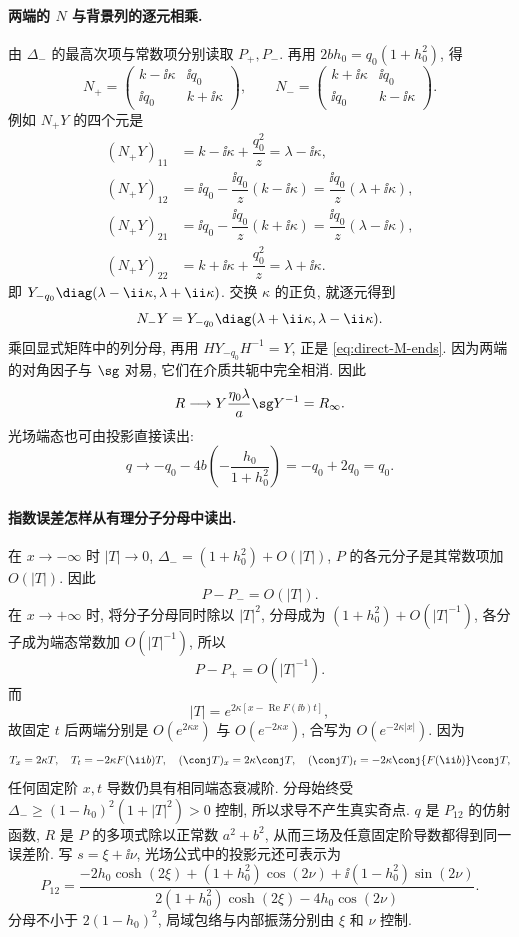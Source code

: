 \paragraph{两端的 $N$ 与背景列的逐元相乘.}
由 $\Delta_-$ 的最高次项与常数项分别读取 $P_+,P_-$.
再用 $2bh_0=q_0(1+h_0^2)$, 得
\[
N_+=\begin{pmatrix}k-\ii\kappa&\ii q_0\\
\ii q_0&k+\ii\kappa\end{pmatrix},\qquad
N_-=\begin{pmatrix}k+\ii\kappa&\ii q_0\\
\ii q_0&k-\ii\kappa\end{pmatrix}.
\]
例如 $N_+Y$ 的四个元是
\[
\begin{aligned}
(N_+Y)_{11}&=k-\ii\kappa+\dfrac{q_0^2}{z}=\lambda-\ii\kappa,\\
(N_+Y)_{12}&=\ii q_0-\dfrac{\ii q_0}{z}(k-\ii\kappa)
=\dfrac{\ii q_0}{z}(\lambda+\ii\kappa),\\
(N_+Y)_{21}&=\ii q_0-\dfrac{\ii q_0}{z}(k+\ii\kappa)
=\dfrac{\ii q_0}{z}(\lambda-\ii\kappa),\\
(N_+Y)_{22}&=k+\ii\kappa+\dfrac{q_0^2}{z}=\lambda+\ii\kappa.
\end{aligned}
\]
即 $Y_{-q_0}\diag(\lambda-\ii\kappa,\lambda+\ii\kappa)$.
交换 $\kappa$ 的正负, 就逐元得到
\[
N_-Y=Y_{-q_0}\diag(\lambda+\ii\kappa,\lambda-\ii\kappa).
\]
乘回显式矩阵中的列分母, 再用 $HY_{-q_0}H^{-1}=Y$,
正是 \eqref{eq:direct-M-ends}.
因为两端的对角因子与 $\sg$ 对易, 它们在介质共轭中完全相消.
因此
\[
R\longrightarrow Y\dfrac{\eta_0\lambda}{a}\sg Y^{-1}=R_\infty.
\]
光场端态也可由投影直接读出:
\[
q\longrightarrow -q_0-4b\left(-\dfrac{h_0}{1+h_0^2}\right)
=-q_0+2q_0=q_0.
\]

\paragraph{指数误差怎样从有理分子分母中读出.}
在 $x\to-\infty$ 时 $|T|\to0$,
$\Delta_-=(1+h_0^2)+O(|T|)$,
$P$ 的各元分子是其常数项加 $O(|T|)$.
因此
\[
P-P_-=O(|T|).
\]
在 $x\to+\infty$ 时, 将分子分母同时除以 $|T|^2$,
分母成为 $(1+h_0^2)+O(|T|^{-1})$,
各分子成为端态常数加 $O(|T|^{-1})$, 所以
\[
P-P_+=O(|T|^{-1}).
\]
而
\[
|T|=e^{2\kappa[x-\operatorname{Re}F(\ii b)t]},
\]
故固定 $t$ 后两端分别是 $O(e^{2\kappa x})$ 与
$O(e^{-2\kappa x})$, 合写为 $O(e^{-2\kappa|x|})$.
因为
\[
T_x=2\kappa T,\quad
T_t=-2\kappa F(\ii b)T,\quad
(\conj T)_x=2\kappa\conj T,\quad
(\conj T)_t=-2\kappa\conj{F(\ii b)}\conj T,
\]
任何固定阶 $x,t$ 导数仍具有相同端态衰减阶.
分母始终受 $\Delta_-\ge(1-h_0)^2(1+|T|^2)>0$ 控制,
所以求导不产生真实奇点.
$q$ 是 $P_{12}$ 的仿射函数,
$R$ 是 $P$ 的多项式除以正常数 $a^2+b^2$,
从而三场及任意固定阶导数都得到同一误差阶.
写 $s=\xi+\ii\nu$, 光场公式中的投影元还可表示为
\begin{equation}\label{eq:hyperbolic-projector}
P_{12}=\dfrac{-2h_0\cosh(2\xi)+(1+h_0^2)\cos(2\nu)+\ii(1-h_0^2)\sin(2\nu)}
{2(1+h_0^2)\cosh(2\xi)-4h_0\cos(2\nu)}.
\end{equation}
分母不小于 $2(1-h_0)^2$, 局域包络与内部振荡分别由 $\xi$ 和 $\nu$ 控制.
